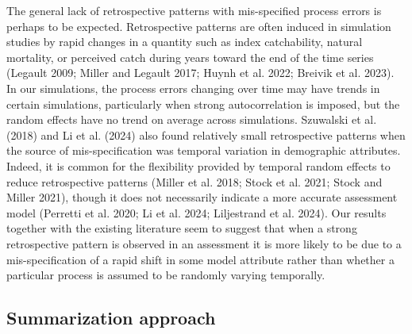 \documentclass[
  12pt,
]{article}
\begin{document}
The general lack of retrospective patterns with mis-specified process
errors is perhaps to be expected. Retrospective patterns are often
induced in simulation studies by rapid changes in a quantity such as
index catchability, natural mortality, or perceived catch during years
toward the end of the time series (Legault 2009; Miller and Legault
2017; Huynh et al. 2022; Breivik et al. 2023). In our simulations, the
process errors changing over time may have trends in certain
simulations, particularly when strong autocorrelation is imposed, but
the random effects have no trend on average across simulations.
Szuwalski et al. (2018) and Li et al. (2024) also found relatively small
retrospective patterns when the source of mis-specification was temporal
variation in demographic attributes. Indeed, it is common for the
flexibility provided by temporal random effects to reduce retrospective
patterns (Miller et al. 2018; Stock et al. 2021; Stock and Miller 2021),
though it does not necessarily indicate a more accurate assessment model
(Perretti et al. 2020; Li et al. 2024; Liljestrand et al. 2024). Our
results together with the existing literature seem to suggest that when
a strong retrospective pattern is observed in an assessment it is more
likely to be due to a mis-specification of a rapid shift in some model
attribute rather than whether a particular process is assumed to be
randomly varying temporally.

\subsection*{Summarization approach}\label{summarization-approach}
\end{document}
